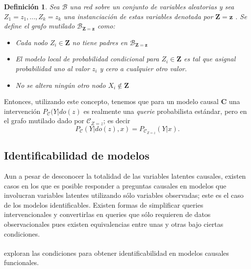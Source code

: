 \documentclass[11pt]{article}
\theoremstyle{plain}
\newtheorem{defi}[teo]{Definición}
\begin{document}
\begin{defi}
Sea $\mathcal{B}$ una red sobre un conjunto de variables aleatorias y sea $Z_1=z_1,...,Z_k=z_k$ una instanciación de estas variables denotada por $\mathbf{Z}=\mathbf{z}$ . Se define el grafo mutilado $\mathcal{B}_{\mathbf{Z}=\mathbf{z}}$ como:
\begin{itemize}
\item Cada nodo $Z_i \in \mathbf{Z}$ no tiene padres en $\mathcal{B}_{\mathbf{Z}=\mathbf{z}}$
\item El modelo local de probabilidad condicional para $Z_i \in \mathbf{Z}$ es tal que asignal probabilidad uno al valor $z_i$ y cero a cualquier otro valor.
\item No se altera ningún otro nodo $X_i \notin \mathbf{Z}$
\end{itemize}
\end{defi}
Entonces, utilizando este concepto, tenemos que para un modelo causal $\mathbf{C}$ una intervención $P_{\mathcal{C}}(Y|do(z)$ es realmente una \textit{querie} probabilista estándar, pero en el grafo mutilado dado por $\mathcal{C}_{Z=z}$; es decir
\[ P_{\mathcal{C}}(Y|do(z),x) = P_{\mathcal{C}_{Z=z}}(Y|x).  \] 
\subsection{Identificabilidad de modelos}
Aun a pesar de desconocer la totalidad de las variables latentes causales, existen casos en los que es posible responder a preguntas causales en modelos que involucran variables latentes utilizando sólo variables observadas; este es el caso de los modelos identificables. Existen formas de simplificar queries intervencionales y convertirlas en queries que sólo requieren de datos observacionales pues existen equivalencias entre unas y otras bajo ciertas condiciones.\\
\\
\cite{peters2012identifiability} exploran las condiciones para obtener identificabilidad en modelos causales funcionales. 
\end{document}
